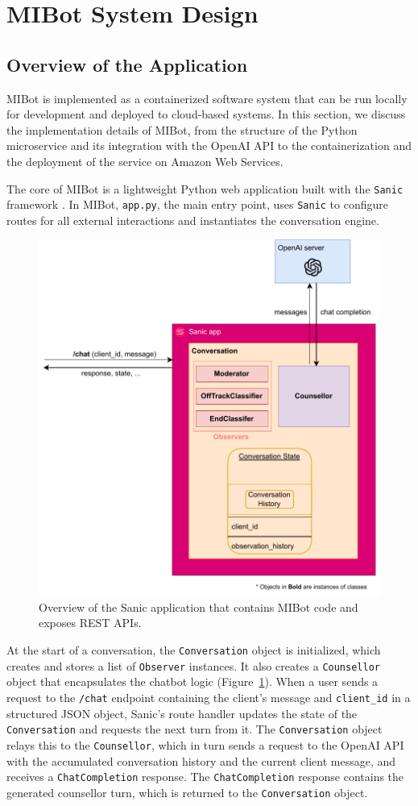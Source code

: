 \section{MIBot System Design}
\label{sec:deployment}


\subsection{Overview of the Application}


MIBot is implemented as a containerized software system that can be run locally for development and deployed to cloud-based systems. In this section, we discuss the implementation details of MIBot, from the structure of the Python microservice and its integration with the OpenAI API to the containerization and the deployment of the service on Amazon Web Services.

The core of MIBot is a lightweight Python web application built with the \texttt{Sanic} framework \cite{pi_sanic}. In MIBot, \texttt{app.py}, the main entry point, uses \texttt{Sanic} to configure routes for all external interactions and instantiates the conversation engine.
\begin{figure}[ht]
  \centering
  \includegraphics[width=0.7\linewidth]{fig/microservice.drawio.pdf} 
  \caption{Overview of the Sanic application that contains MIBot code and exposes REST APIs.}
  \label{fig:microservice}
\end{figure}
At the start of a conversation, the \texttt{Conversation} object is initialized, which creates and stores a list of \texttt{Observer} instances. It also creates a \texttt{Counsellor} object that encapsulates the chatbot logic (Figure~\ref{fig:microservice}). When a user sends a request to the \texttt{/chat} endpoint containing the client's message and \texttt{client\_id} in a structured JSON object, Sanic's route handler updates the state of the \texttt{Conversation} and requests the next turn from it. The \texttt{Conversation} object relays this to the \texttt{Counsellor}, which in turn sends a request to the OpenAI API with the accumulated conversation history and the current client message, and receives a \texttt{ChatCompletion} response. The \texttt{ChatCompletion} response contains the generated counsellor turn, which is returned to the \texttt{Conversation} object.

